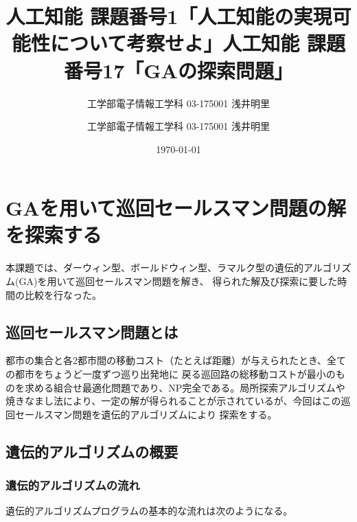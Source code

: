 \documentclass[uplatex]{jsarticle}
\title{人工知能 課題番号1「人工知能の実現可能性について考察せよ」}
\author{工学部電子情報工学科 03-175001 浅井明里}
\title{人工知能 課題番号17「GAの探索問題」}
\author{工学部電子情報工学科 03-175001 浅井明里}
\date{\today}
\makeatletter
\def\maketitle{%
  \null
  \thispagestyle{empty}%
  \vfill
  \begin{center}\leavevmode
    \normalfont
    {\LARGE \@title\par}%
    \vskip 1cm
    {\Large \@author\par}%
    \vskip 1cm
    {\Large \@date\par}%
  \end{center}%
  \vfill
  \null
  \@thanks%
  \cleardoublepage
  }
\makeatother
\begin{document}
\maketitle


\section{GAを用いて巡回セールスマン問題の解を探索する}
本課題では、ダーウィン型、ボールドウィン型、ラマルク型の遺伝的アルゴリズム(GA)を用いて巡回セールスマン問題を解き、
得られた解及び探索に要した時間の比較を行なった。

\subsection{巡回セールスマン問題とは}
都市の集合と各2都市間の移動コスト（たとえば距離）が与えられたとき、全ての都市をちょうど一度ずつ巡り出発地に
戻る巡回路の総移動コストが最小のものを求める組合せ最適化問題であり、NP完全である。局所探索アルゴリズムや
焼きなまし法により、一定の解が得られることが示されているが、今回はこの巡回セールスマン問題を遺伝的アルゴリズムにより
探索をする。

\subsection{遺伝的アルゴリズムの概要}
\subsubsection{遺伝的アルゴリズムの流れ}
遺伝的アルゴリズムプログラムの基本的な流れは次のようになる。
\end{document}
